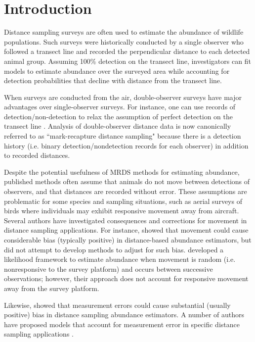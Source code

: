 \documentclass[aoas,preprint]{imsart}
\numberwithin{equation}{section}
\theoremstyle{plain}
\begin{document}
\section{Introduction}

Distance sampling surveys \citep{BurnhamEtAl1980,BucklandEtAl2001} are often used to estimate the abundance of wildlife populations.  Such surveys were historically conducted by a single observer who followed a transect line and recorded the perpendicular distance to each detected animal group.  Assuming 100\% detection on the transect line, investigators can fit models to estimate abundance over the surveyed area while accounting for detection probabilities that decline with distance from the transect line.

When surveys are conducted from the air, double-observer surveys have major advantages over single-observer surveys.  For instance, one can use records of detection/non-detection to relax the assumption of perfect detection on the transect line \citep{BorchersEtAl1998}.  Analysis of double-observer distance data is now canonically referred to as ``mark-recapture distance sampling" \citep[MRDS; ][]{LaakeBorchers2004} because there is a detection history (i.e. binary detection/nondetection records for each observer) in addition to recorded distances.

Despite the potential usefulness of MRDS methods for estimating abundance, published methods often assume that animals do not move between detections of observers, and that distances are recorded without error.  These assumptions are problematic for some species and sampling situations, such as aerial surveys of birds where individuals may exhibit responsive movement away from aircraft.
Several authors have investigated consequences and corrections for movement in distance sampling applications.  For instance, \citet{GlennieEtAl2015} showed that movement could cause considerable bias (typically positive) in distance-based abundance estimators, but did not attempt to develop methods to adjust for such bias. \citet{HibyLovell1998} developed a likelihood framework to estimate abundance when movement is random (i.e. nonresponsive to the survey platform) and occurs between successive observations; however, their approach does not account for responsive movement away from the survey platform.

Likewise, \citet{BorchersEtAl2010} showed that measurement errors could cause substantial (usually positive) bias in distance sampling abundance estimators. A number of authors have proposed models that account for measurement error in specific distance sampling applications \citep[see e.g.][and references therein]{SchwederEtAl1999,BorchersEtAl2010}.
\end{document}
